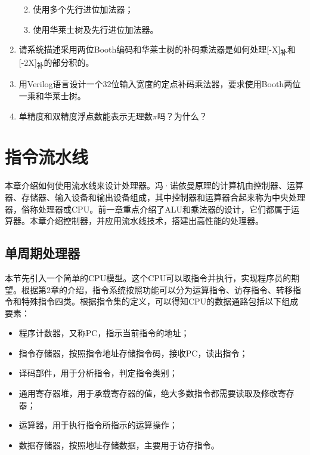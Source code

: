 \documentclass[]{ctexbook}
\providecommand{\tightlist}{%
  \setlength{\itemsep}{0pt}\setlength{\parskip}{0pt}}
\begin{document}
\begin{enumerate}
  \begin{enumerate}
  \def\labelenumii{\alph{enumii})}
  \tightlist
  \item
    使用多个先行进位加法器；
  \item
    使用华莱士树及先行进位加法器。
  \end{enumerate}
\item
  请系统描述采用两位Booth编码和华莱士树的补码乘法器是如何处理{[}-X{]}\textsubscript{补}和{[}-2X{]}\textsubscript{补}的部分积的。
\item
  用Verilog语言设计一个32位输入宽度的定点补码乘法器，要求使用Booth两位一乘和华莱士树。
\item
  单精度和双精度浮点数能表示无理数\(\pi\)吗？为什么？
\end{enumerate}

\hypertarget{ux6307ux4ee4ux6d41ux6c34ux7ebf}{%
\chapter{指令流水线}\label{ux6307ux4ee4ux6d41ux6c34ux7ebf}}

本章介绍如何使用流水线来设计处理器。冯·诺依曼原理的计算机由控制器、运算器、存储器、输入设备和输出设备组成，其中控制器和运算器合起来称为中央处理器，俗称处理器或CPU。前一章重点介绍了ALU和乘法器的设计，它们都属于运算器。本章介绍控制器，并应用流水线技术，搭建出高性能的处理器。

\hypertarget{ux5355ux5468ux671fux5904ux7406ux5668}{%
\section{单周期处理器}\label{ux5355ux5468ux671fux5904ux7406ux5668}}

本节先引入一个简单的CPU模型。这个CPU可以取指令并执行，实现程序员的期望。根据第2章的介绍，指令系统按照功能可以分为运算指令、访存指令、转移指令和特殊指令四类。根据指令集的定义，可以得知CPU的数据通路包括以下组成要素：

\begin{itemize}
\tightlist
\item
  程序计数器，又称PC，指示当前指令的地址；
\item
  指令存储器，按照指令地址存储指令码，接收PC，读出指令；
\item
  译码部件，用于分析指令，判定指令类别；
\item
  通用寄存器堆，用于承载寄存器的值，绝大多数指令都需要读取及修改寄存器；
\item
  运算器，用于执行指令所指示的运算操作；
\item
  数据存储器，按照地址存储数据，主要用于访存指令。
\end{itemize}
\end{document}
